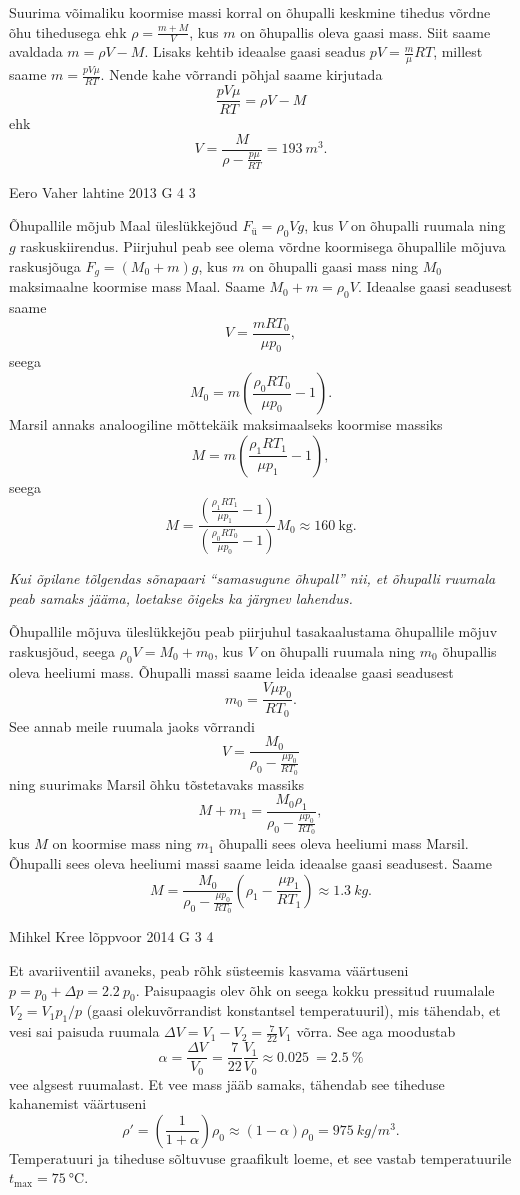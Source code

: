 \documentclass[11pt]{article}
\begin{document}
{{\ifSolution
Suurima võimaliku koormise massi korral on õhupalli keskmine tihedus võrdne õhu tihedusega ehk $\rho=\frac{m+M}{V}$, kus $m$ on õhupallis oleva gaasi mass. Siit saame avaldada $m=\rho V-M$. Lisaks kehtib ideaalse gaasi seadus $pV=\frac{m}{\mu}RT$, millest saame $m=\frac{pV\mu}{RT}$. Nende kahe võrrandi põhjal saame kirjutada
\[
\frac{pV\mu}{RT}=\rho V-M
\]
ehk
\[
V=\frac{M}{\rho-\frac{p\mu}{RT}}=\SI{193}{m^3}.
\]
\fi
}

{Eero Vaher} %
{lahtine} %
{2013} %
{G 4} %
{3} %
{

\ifSolution
Õhupallile mõjub Maal üleslükkejõud $F_{ü}=\rho_0Vg$, kus $V$ on õhupalli ruumala ning $g$ raskuskiirendus. Piirjuhul peab see olema võrdne koormisega õhupallile mõjuva raskusjõuga $F_g=(M_0+m)g$, kus $m$ on õhupalli gaasi mass ning $M_0$ maksimaalne koormise mass Maal. Saame $M_0+m=\rho_0V$. Ideaalse gaasi seadusest saame
\[
V=\frac{mRT_0}{\mu p_0},
\]
seega 
\[
M_0=m\left(\frac{\rho_0 RT_0}{\mu p_0}-1\right).
\]
Marsil annaks analoogiline mõttekäik maksimaalseks koormise massiks
\[
M=m(\frac{\rho_1RT_1}{\mu p_1}-1),
\]
seega
\[M=\frac{\left(\frac{\rho_1RT_1}{\mu p_1}-1\right)}{(\frac{\rho_0RT_0}{\mu p_0}-1)}M_0\approx \SI{160}{\kilogram}.
\]

{\em Kui õpilane tõlgendas sõnapaari ``samasugune õhupall'' nii, et õhupalli ruumala peab samaks jääma, loetakse õigeks ka järgnev lahendus.}

Õhupallile mõjuva üleslükkejõu peab piirjuhul tasakaalustama õhupallile mõjuv raskusjõud, seega $\rho_0 V=M_0+m_0$, kus $V$ on õhupalli ruumala ning $m_0$ õhupallis oleva heeliumi mass. Õhupalli massi saame leida ideaalse gaasi seadusest
\[
m_0=\frac{V\mu p_0}{RT_0}.
\]
See annab meile ruumala jaoks võrrandi
\[
V=\frac{M_0}{\rho_0-\frac{\mu p_0}{RT_0}}
\]
ning suurimaks Marsil õhku tõstetavaks massiks
\[
M+m_1=\frac{M_0\rho_1}{\rho_0-\frac{\mu p_0}{RT_0}},
\]
kus $M$ on koormise mass ning $m_1$ õhupalli sees oleva heeliumi mass Marsil. Õhupalli sees oleva heeliumi massi saame leida ideaalse gaasi seadusest. Saame
\[
M=\frac{M_0}{\rho_0-\frac{\mu p_0}{RT_0}}\left(\rho_1-\frac{\mu p_1}{RT_1}\right)\approx \SI{1,3}{kg}.
\]
\fi
}

{Mihkel Kree} %
{lõppvoor} %
{2014} %
{G 3} %
{4} %
{

\ifSolution
Et avariiventiil avaneks, peab rõhk süsteemis kasvama väärtuseni $p=p_0+\Delta p = \SI{2.2}{}p_0$. Paisupaagis olev õhk on seega kokku pressitud ruumalale $V_2=V_1 p_1/p$ (gaasi olekuvõrrandist konstantsel temperatuuril), mis tähendab, et vesi sai paisuda ruumala $\Delta V = V_1-V_2 = \frac{7}{22}V_1$ võrra. See aga moodustab \[\alpha = \frac{\Delta V}{V_0}= \frac{7}{22}\frac{V_1}{V_0}\approx \SI{0.025}{} = \SI{2.5}{}\%\] vee algsest ruumalast. Et vee mass jääb samaks, tähendab see tiheduse kahanemist väärtuseni \[\rho'=\left(\frac{1}{1+\alpha}\right)\rho_0\approx(1-\alpha)\rho_0= \SI{975}{kg/m^3}.\]
Temperatuuri ja tiheduse sõltuvuse graafikult loeme, et see vastab temperatuurile $t_\text{max}=\SI{75}{\celsius}$.
\fi
}

}
\end{document}

